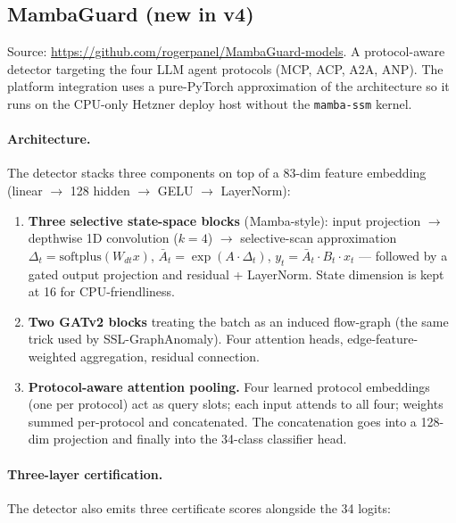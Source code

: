 \documentclass[11pt,a4paper]{article}
\begin{document}
\subsection{MambaGuard (new in v4)}
\label{sec:mambaguard}

Source: \url{https://github.com/rogerpanel/MambaGuard-models}.  A
protocol-aware detector targeting the four LLM agent protocols
(MCP, ACP, A2A, ANP).  The platform integration uses a pure-PyTorch
approximation of the architecture so it runs on the CPU-only Hetzner
deploy host without the \texttt{mamba-ssm} kernel.

\paragraph{Architecture.}
The detector stacks three components on top of a 83-dim feature
embedding (linear $\to$ 128 hidden $\to$ GELU $\to$ LayerNorm):

\begin{enumerate}[nosep,leftmargin=*]
  \item \textbf{Three selective state-space blocks} (\(_{}\!\)Mamba-style):
        input projection $\to$ depthwise 1D convolution
        ($k{=}4$) $\to$ selective-scan approximation
        \(\Delta_t = \mathrm{softplus}(W_{\!dt} x)\),
        \(\bar A_t = \exp(A \cdot \Delta_t)\),
        \(y_t = \bar A_t \cdot B_t \cdot x_t\) ---
        followed by a gated output projection and residual + LayerNorm.
        State dimension is kept at 16 for CPU-friendliness.
  \item \textbf{Two GATv2 blocks} treating the batch as an
        induced flow-graph (the same trick used by SSL-GraphAnomaly).
        Four attention heads, edge-feature-weighted aggregation,
        residual connection.
  \item \textbf{Protocol-aware attention pooling.}
        Four learned protocol embeddings (one per protocol) act as
        query slots; each input attends to all four; weights summed
        per-protocol and concatenated.  The concatenation goes into a
        128-dim projection and finally into the 34-class classifier
        head.
\end{enumerate}

\paragraph{Three-layer certification.}
The detector also emits three certificate scores alongside the
34 logits:
\end{document}
